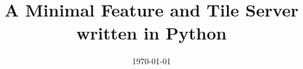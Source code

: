 \title  {A Minimal Feature and Tile Server written in Python}
\addresses  {\groupname\\\deptname\\\univname}
\date       {\today}
\subject    {}
\keywords   {}


\maketitle